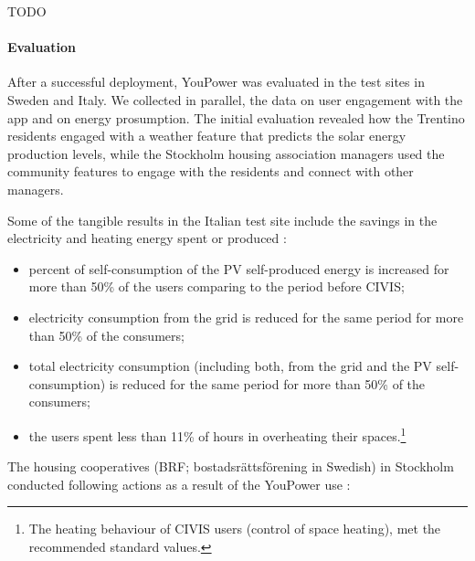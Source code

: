 TODO

\paragraph{Evaluation} After a successful deployment, YouPower was evaluated in the test sites in Sweden and Italy. We collected in parallel, the data on user engagement with the app and on energy prosumption. The initial evaluation revealed how the Trentino residents engaged with a weather feature that predicts the solar energy production levels, while the Stockholm housing association managers used the community features to engage with the residents and connect with other managers. 

Some of the tangible results in the Italian test site include the savings in the electricity and heating energy spent or produced \cite{civics}:
\begin{itemize}
	\setlength{\itemsep}{0mm}
	\item percent	of	self-consumption	of	 the	PV	self-produced energy	 is	 increased	 for more than	50\% of the	users	comparing	to	the period before CIVIS;
	\item electricity	consumption	from the	grid	is	reduced for the same period for	more than	50\% of the	consumers;	
	\item 	total	 electricity	 consumption	 (including both, from	the grid	 and	the PV	 self-consumption)		is	reduced for the same period for	more than	50\% of the	consumers;	
	\item  the users spent less than 11\% of hours in overheating their spaces.\footnote{The	heating behaviour	 of	 CIVIS	 users (control	 of	 space	 heating),	 met	 the	recommended	standard	values.}
\end{itemize}

The housing cooperatives (BRF; bostadsr\"attsf\"orening	in	Swedish) in Stockholm conducted following actions as a result of the YouPower use \cite{civics}:

